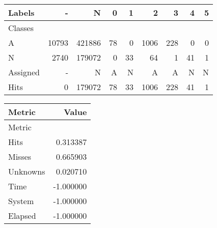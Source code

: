 \begin{tabular}{l|r|r|r|r|r|r|r|r}

Labels &      - &       N &   0 &   1 &     2 &    3 &   4 &  5 \\\hline
Classes  &        &         &     &     &       &      &     &    \\\hline
\hline
A        &  10793 &  421886 &  78 &   0 &  1006 &  228 &   0 &  0 \\\hline
N        &   2740 &  179072 &   0 &  33 &    64 &    1 &  41 &  1 \\\hline
\hline
Assigned &      - &       N &   A &   N &     A &    A &   N &  N \\\hline
Hits     &      0 &  179072 &  78 &  33 &  1006 &  228 &  41 &  1 
\end{tabular}
\begin{tabular}{l|r}

Metric   &     Value \\\hline
Metric   &           \\\hline
\hline
Hits     &  0.313387 \\\hline
Misses   &  0.665903 \\\hline
Unknowns &  0.020710 \\\hline
Time     & -1.000000 \\\hline
System   & -1.000000 \\\hline
Elapsed  & -1.000000 
\end{tabular}
